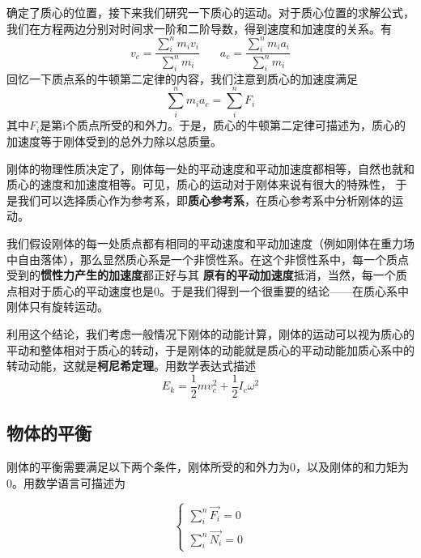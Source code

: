 \documentclass{article}
\begin{document}
    确定了质心的位置，接下来我们研究一下质心的运动。对于质心位置的求解公式，我们在方程两边分别对时间求一阶和二阶导数，得到速度和加速度的关系。有
    \begin{equation*}
        v_c = \frac{\displaystyle \sum_i^n m_i v_i}{\displaystyle \sum_i^n m_i}\ \ \ \ \ \ \ \ a_c = \frac{\displaystyle \sum_i^n m_i a_i}{\displaystyle \sum_i^n m_i}
    \end{equation*}
    回忆一下质点系的牛顿第二定律的内容，我们注意到质心的加速度满足
    \begin{equation*}
        \sum_i^n m_i a_c = \sum_i^n F_i
    \end{equation*}
    其中\(F_i\)是第i个质点所受的和外力。于是，质心的牛顿第二定律可描述为，质心的加速度等于刚体受到的总外力除以总质量。

    刚体的物理性质决定了，刚体每一处的平动速度和平动加速度都相等，自然也就和质心的速度和加速度相等。可见，质心的运动对于刚体来说有很大的特殊性，
    于是我们可以选择质心作为参考系，即\textbf{质心参考系}，在质心参考系中分析刚体的运动。

    我们假设刚体的每一处质点都有相同的平动速度和平动加速度（例如刚体在重力场中自由落体），那么显然质心系是一个非惯性系。在这个非惯性系中，每一个质点受到的\textbf{惯性力产生的加速度}都正好与其
    \textbf{原有的平动加速度}抵消，当然，每一个质点相对于质心的平动速度也是0。于是我们得到一个很重要的结论——在质心系中刚体只有旋转运动。

    利用这个结论，我们考虑一般情况下刚体的动能计算，刚体的运动可以视为质心的平动和整体相对于质心的转动，于是刚体的动能就是质心的平动动能加质心系中的转动动能，这就是\textbf{柯尼希定理}。用数学表达式描述
    \begin{equation*}
        E_k = \frac{1}{2}mv_c^2 + \frac{1}{2} I_c \omega^2
    \end{equation*}
    
    \subsection{物体的平衡}
    刚体的平衡需要满足以下两个条件，刚体所受的和外力为0，以及刚体的和力矩为0。用数学语言可描述为

    \[
        \begin{cases}
            \displaystyle \sum_i^n \vec{F_i} = 0 \\
            \displaystyle \sum_i^n \vec{N_i} = 0 
        \end{cases}
    \]
    
\end{document}
